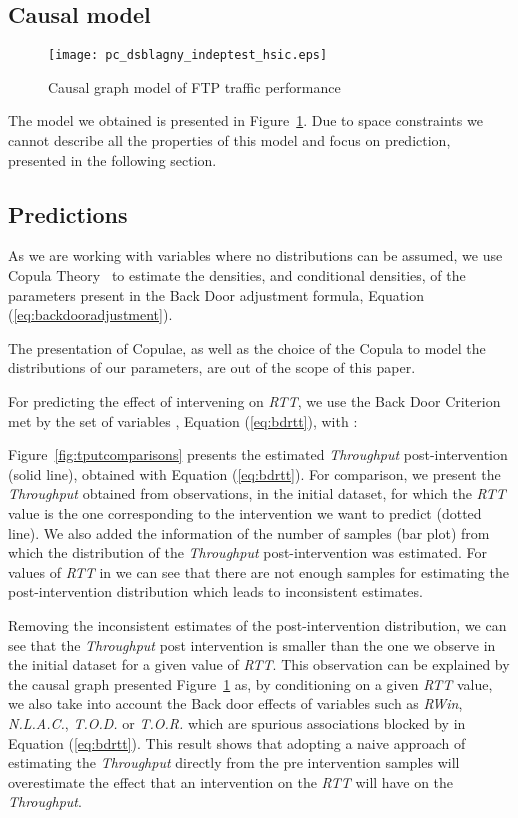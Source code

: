 \documentclass[]{algotel}
\begin{document}
\subsection{Causal model}
\begin{figure}
 \centering
 \texttt{[image: pc\_dsblagny\_indeptest\_hsic.eps]}
 \caption{Causal graph model of FTP traffic performance}
 \label{fig:causalgraphftp}
\end{figure}

The model we obtained is presented in Figure~\ref{fig:causalgraphftp}. Due to space constraints we cannot describe all the properties of this model and focus on prediction, presented in the following section. 


\subsection{Predictions}
    As we are working with variables where no distributions can be assumed, we use Copula Theory~\cite{jaworski2010copula} to estimate the densities, and conditional densities, of the parameters present in the Back Door adjustment formula, Equation (\ref{eq:backdooradjustment}).
    
    The presentation of Copulae, as well as the choice of the Copula to model the distributions of our parameters, are out of the scope of this paper.
    
   For predicting the effect of intervening on \emph{RTT}, we use the Back Door Criterion met by the set of variables , Equation (\ref{eq:bdrtt}), with :
   
    
   Figure~\ref{fig:tputcomparisons} presents the estimated \emph{Throughput} post-intervention (solid line), obtained with Equation (\ref{eq:bdrtt}). For comparison, we present the \emph{Throughput} obtained from observations, in the initial dataset, for which the \emph{RTT} value is the one corresponding to the intervention we want to predict (dotted line). We also added the information of the number of samples (bar plot) from which the distribution of the \emph{Throughput} post-intervention was estimated. For values of \emph{RTT} in  we can see that there are not enough samples for estimating the post-intervention distribution which leads to inconsistent estimates.
   
   Removing the inconsistent estimates of the post-intervention distribution, we can see that the \emph{Throughput} post intervention is smaller than the one we observe in the initial dataset for a given value of \emph{RTT}. This observation can be explained by the causal graph presented Figure~\ref{fig:causalgraphftp} as, by conditioning on a given \emph{RTT} value, we also take into account the Back door effects of variables such as \emph{RWin}, \emph{N.L.A.C.}, \emph{T.O.D.} or \emph{T.O.R.} which are spurious associations blocked by  in Equation (\ref{eq:bdrtt}). This result shows that adopting a naive approach of estimating the \emph{Throughput} directly from the pre intervention samples will overestimate the effect that an intervention on the \emph{RTT} will have on the \emph{Throughput}.
\end{document}
